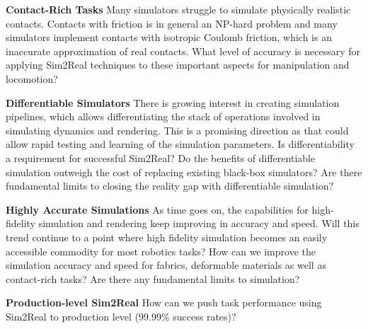 
{\bf Contact-Rich Tasks} Many simulators struggle to simulate physically realistic contacts. Contacts with friction is in general an NP-hard problem and many simulators implement contacts with isotropic Coulomb friction, which is an inaccurate approximation of real contacts. What level of accuracy is necessary for applying Sim2Real techniques to these important aspects for manipulation and locomotion?

{\bf Differentiable Simulators} There is growing interest in creating simulation pipelines, which allows differentiating the stack of operations involved in simulating dynamics and rendering. This is a promising direction as that could allow rapid testing and learning of the simulation parameters. Is differentiability a requirement for successful Sim2Real? Do the benefits of differentiable simulation outweigh the cost of replacing existing black-box simulators? Are there fundamental limits to closing the reality gap with differentiable simulation?

{\bf Highly Accurate Simulations} As time goes on, the capabilities for high-fidelity simulation and rendering keep improving in accuracy and speed. Will this trend continue to a point where high fidelity simulation becomes an easily accessible commodity for most robotics tasks? How can we improve the simulation accuracy and speed for fabrics, deformable materials as well as contact-rich tasks? Are there any fundamental limits to simulation?


{\bf Production-level Sim2Real} How can we push task performance using Sim2Real to production level (99.99\% success rates)?

